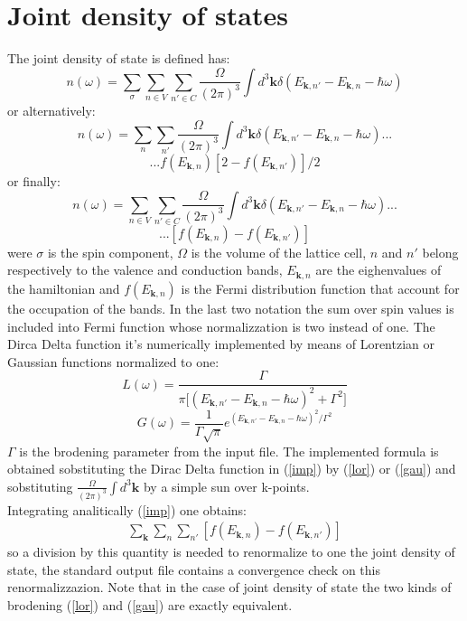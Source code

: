 \documentclass[twocolumn]{article}
\begin{document}
\section{Joint density of states}
The joint density of state is defined has:
\begin{displaymath}
n(\omega)=\sum_{\sigma}\sum_{n\in V}\sum_{n'\in C}\frac{\Omega}{(2\pi)^3}\int d^3\textbf{k}\delta(E_{\textbf{k},n'}-E_{\textbf{k},n}
-\hbar\omega)
\end{displaymath}
or alternatively:
\begin{equation}
n(\omega)=\sum_{n}\sum_{n'}\frac{\Omega}{(2\pi)^3}\int d^3\textbf{k}\delta(E_{\textbf{k},n'}-E_{\textbf{k},n}
-\hbar\omega)...
\label{imp2}
\end{equation}
\begin{displaymath}
...f(E_{\textbf{k},n})[2-f(E_{\textbf{k},n'})]/2
\end{displaymath}
or finally:
\begin{equation}
n(\omega)=\sum_{n\in V}\sum_{n'\in C}\frac{\Omega}{(2\pi)^3}\int d^3\textbf{k}\delta(E_{\textbf{k},n'}-E_{\textbf{k},n}
-\hbar\omega)...
\label{imp}
\end{equation}
\begin{displaymath}
...[f(E_{\textbf{k},n})-f(E_{\textbf{k},n'})]
\end{displaymath}
were $\sigma$ is the spin component, $\Omega$ is the volume of the lattice cell, $n$ and $n'$ belong respectively to the 
valence and conduction bands, 
$E_{\textbf{k},n}$ are the eighenvalues of the hamiltonian and $f(E_{\textbf{k},n})$ is the Fermi distribution function 
that account for the occupation of the bands. In the last two notation the sum over spin values is included into
Fermi function whose normalizzation is two instead of one.   
The Dirca Delta function it's numerically implemented by means of Lorentzian 
or Gaussian functions normalized to one:
\begin{equation}
L(\omega)=\frac{\Gamma}{\pi\big[(E_{\textbf{k},n'}-E_{\textbf{k},n}-\hbar\omega)^2+\Gamma^2\big]}
\label{lor}
\end{equation}
\begin{equation}
G(\omega)=\frac{1}{\Gamma\sqrt{\pi}}e^{(E_{\textbf{k},n'}-E_{\textbf{k},n}-\hbar\omega)^2/\Gamma^2}
\label{gau}
\end{equation}
$\Gamma$ is the brodening parameter from the input file. The implemented formula is obtained sobstituting the 
Dirac Delta function in (\ref{imp}) by (\ref{lor}) or (\ref{gau}) and sobstituting $\frac{\Omega}{(2\pi)^3}\int 
d^3\textbf{k}$ by a simple sun over k-points.\\
Integrating analitically (\ref{imp}) one obtains: 
\begin{eqnarray}
\sum_{\textbf{k}}\sum_{n}\sum_{n'}[f(E_{\textbf{k},n})-f(E_{\textbf{k},n'})]
\end{eqnarray}
so a division by this quantity is needed to renormalize to one the joint density of state, the standard output file 
contains a convergence check on this renormalizzazion. Note that in the case of 
joint density of state the two kinds of brodening (\ref{lor}) and (\ref{gau}) are exactly equivalent.
\end{document}
